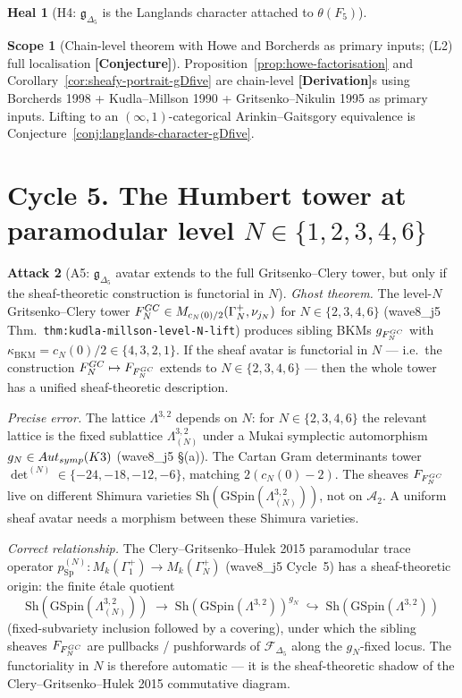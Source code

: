\documentclass[11pt]{amsart}
\theoremstyle{definition}
\newtheorem{attack}{Attack}
\newtheorem{heal}[attack]{Heal}
\newtheorem{scope}[theorem]{Scope}
\providecommand{\kBKM}{\kappa_{\mathrm{BKM}}}
\providecommand{\Sh}{\mathrm{Sh}}
\providecommand{\GSpin}{\mathrm{GSpin}}
\providecommand{\Sp}{\mathrm{Sp}}
\providecommand{\cF}{\mathcal{F}}
\providecommand{\Dfive}{\Delta_5}
\providecommand{\gDfive}{\mathfrak{g}_{\Dfive}}
\begin{document}
\begin{heal}[H4: $\gDfive$ is the Langlands character attached to
$\theta(F_5)$]
\begin{scope}[Chain-level theorem with Howe and Borcherds as primary
inputs; (L2) full localisation \textbf{[Conjecture]}]\label{scope:howe}
Proposition~\ref{prop:howe-factorisation} and
Corollary~\ref{cor:sheafy-portrait-gDfive} are chain-level
\textbf{[Derivation]}s using Borcherds 1998 + Kudla--Millson 1990 +
Gritsenko--Nikulin 1995 as primary inputs. Lifting to an
$(\infty, 1)$-categorical Arinkin--Gaitsgory equivalence is
Conjecture~\ref{conj:langlands-character-gDfive}.
\end{scope}
\end{heal}

\section{Cycle 5. The Humbert tower at paramodular level
$N \in \{1, 2, 3, 4, 6\}$}

\begin{attack}[A5: $\gDfive$ avatar extends to the full Gritsenko--Clery
tower, but only if the sheaf-theoretic construction is functorial in
$N$]\leavevmode

\noindent\emph{Ghost theorem.} The level-$N$ Gritsenko--Clery tower
$F^{\rm GC}_N \in M_{c_N(0)/2}(\Gamma_N^+, \nu_{j_N})$ for
$N \in \{2, 3, 4, 6\}$ (wave8\_j5 Thm.~\texttt{thm:kudla-millson-level-N-lift})
produces sibling BKMs $\mathfrak{g}_{F^{\rm GC}_N}$ with
$\kBKM = c_N(0)/2 \in \{4, 3, 2, 1\}$. If the sheaf avatar is
functorial in $N$ --- i.e.\ the construction
$F^{\rm GC}_N \mapsto \cF_{F^{\rm GC}_N}$ extends to
$N \in \{2, 3, 4, 6\}$ --- then the whole tower has a unified
sheaf-theoretic description.

\noindent\emph{Precise error.} The lattice $\Lambda^{3,2}$ depends on
$N$: for $N \in \{2, 3, 4, 6\}$ the relevant lattice is the fixed
sublattice $\Lambda^{3,2}_{(N)}$ under a Mukai symplectic
automorphism $g_N \in \mathrm{Aut}_{\rm symp}(K3)$ (wave8\_j5 \S(a)).
The Cartan Gram determinants tower $\det^{(N)} \in \{-24, -18, -12, -6\}$,
matching $2(c_N(0) - 2)$. The sheaves $\cF_{F^{\rm GC}_N}$ live on
different Shimura varieties $\Sh(\GSpin(\Lambda^{3,2}_{(N)}))$, not
on $\mathcal{A}_2$. A uniform sheaf avatar needs a morphism between
these Shimura varieties.

\noindent\emph{Correct relationship.} The Clery--Gritsenko--Hulek 2015
paramodular trace operator
$p^{(N)}_{\Sp} \colon M_k(\Gamma_1^+) \to M_k(\Gamma_N^+)$
(wave8\_j5 Cycle~5) has a sheaf-theoretic origin: the finite \'etale
quotient
\[
 \Sh(\GSpin(\Lambda^{3,2}_{(N)})) \;\to\;
 \Sh(\GSpin(\Lambda^{3,2}))^{g_N}
 \;\hookrightarrow\; \Sh(\GSpin(\Lambda^{3,2}))
\]
(fixed-subvariety inclusion followed by a covering), under which the
sibling sheaves $\cF_{F^{\rm GC}_N}$ are pullbacks / pushforwards of
$\cF_{\Dfive}$ along the $g_N$-fixed locus. The functoriality in $N$
is therefore automatic --- it is the sheaf-theoretic shadow of the
Clery--Gritsenko--Hulek 2015 commutative diagram.
\end{attack}
\end{document}
